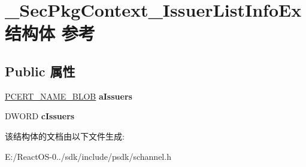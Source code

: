 \hypertarget{struct___sec_pkg_context___issuer_list_info_ex}{}\section{\+\_\+\+Sec\+Pkg\+Context\+\_\+\+Issuer\+List\+Info\+Ex结构体 参考}
\label{struct___sec_pkg_context___issuer_list_info_ex}
\subsection*{Public 属性}
\begin{DoxyCompactItemize}
\item 
\mbox{\label{struct___sec_pkg_context___issuer_list_info_ex_a462242b0033dbacd3111280f720663e7}} 
\hyperlink{struct___c_r_y_p_t_o_a_p_i___b_l_o_b}{P\+C\+E\+R\+T\+\_\+\+N\+A\+M\+E\+\_\+\+B\+L\+OB} {\bfseries a\+Issuers}
\item 
\mbox{\label{struct___sec_pkg_context___issuer_list_info_ex_a839e940f9a92066378806990faf29b71}} 
D\+W\+O\+RD {\bfseries c\+Issuers}
\end{DoxyCompactItemize}


该结构体的文档由以下文件生成\+:\begin{DoxyCompactItemize}
\item 
E\+:/\+React\+O\+S-\/0../sdk/include/psdk/schannel.\+h\end{DoxyCompactItemize}
